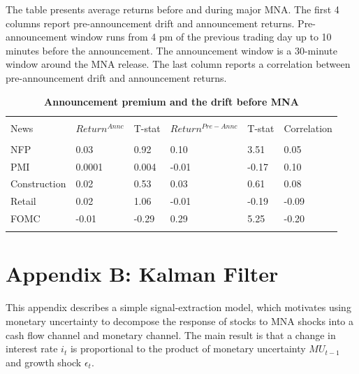 \documentclass[12pt]{article}
\begin{document}
\begin{table}[!htbp] \centering 
  \caption{\textbf{Announcement premium and the drift before MNA}} 
  \label{}
  \begin{flushleft}
    {\medskip\small
 The table presents average returns before and during major MNA. The first 4 columns report pre-announcement drift and announcement returns. Pre-announcement window runs from 4 pm of the previous trading day up to 10 minutes before the announcement. The announcement window is a 30-minute window around the MNA release. The last column reports a correlation between pre-announcement drift and announcement returns.}
    \medskip
    \end{flushleft}
\begin{tabular}{@{\extracolsep{5pt}} llllll} 
\\[-1.8ex]\hline 
\hline \\[-1.8ex] 
News & $Return^{Annc}$ & T-stat & $Return^{Pre-Annc}$ & T-stat & Correlation \\ 
\hline \\[-1.8ex] 
NFP & 0.03 & 0.92 & 0.10 & 3.51 & 0.05 \\ 
PMI & 0.0001 & 0.004 & -0.01 & -0.17 & 0.10 \\ 
Construction & 0.02 & 0.53 & 0.03 & 0.61 & 0.08 \\ 
Retail & 0.02 & 1.06 & -0.01 & -0.19 & -0.09 \\ 
FOMC & -0.01 & -0.29 & 0.29 & 5.25 & -0.20 \\ 
\hline \\[-1.8ex] 
\end{tabular} 
\end{table} 


\pagebreak
\clearpage



\section{Appendix B: Kalman Filter} \label{sec:Model}
\setcounter{equation}{0}
\renewcommand{\theequation}{B\thechapter.\arabic{equation}}

\paragraph{}
This appendix describes a simple signal-extraction model, which motivates using monetary uncertainty to decompose the response of stocks to MNA shocks into a cash flow channel and monetary channel. The main result is that a change in interest rate $i_t$ is proportional to the product of monetary uncertainty $MU_{t-1}$ and growth shock $\epsilon_t$.
\end{document}
